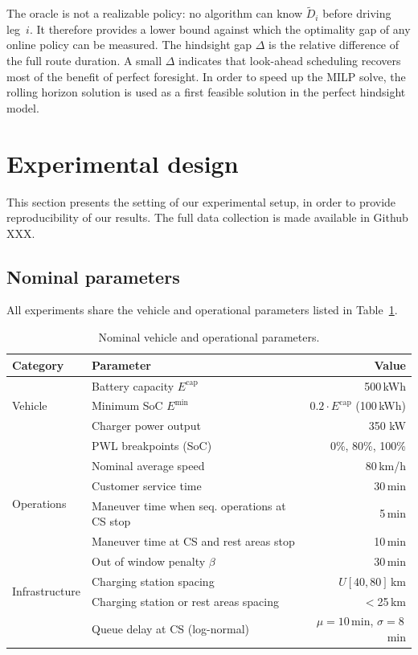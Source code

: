 \documentclass[preprint,12pt,3p]{elsarticle}
\begin{document}
The oracle is not a realizable policy: no algorithm can know $\tilde{D}_i$ before driving leg~$i$. It therefore provides a lower bound against which the optimality gap of any online policy can be measured.  The hindsight gap $\Delta$ is the relative difference of the full route duration. A small $\Delta$ indicates that look-ahead scheduling recovers most of the benefit of perfect foresight. In order to speed up the MILP solve, the rolling horizon solution is used as a first feasible solution in the perfect hindsight model.


\section{Experimental design} \label{sec:exp}
This section presents the setting of our experimental setup, in order to provide reproducibility of our results. The full data collection is made available in Github XXX.

\subsection{Nominal parameters}
All experiments share the vehicle and operational parameters listed in Table~\ref{tab:params}.

\begin{table}[ht]
\centering
\caption{Nominal vehicle and operational parameters.}
\label{tab:params}
\begin{tabular}{llr}
\toprule
\textbf{Category} & \textbf{Parameter} & \textbf{Value} \\
\midrule
\multirow{3}{*}{Vehicle}
  & Battery capacity $E^{\mathrm{cap}}$        & 500\,kWh \\
  & Minimum SoC $E^{\min}$                      & $0.2\cdot E^{\mathrm{cap}}$ (100\,kWh) \\
\midrule
\multirow{2}{*}{Charging}
  & Charger power output                      & 350 kW \\
  & PWL breakpoints (SoC)                       & 0\%, 80\%, 100\% \\
\midrule
\multirow{4}{*}{Operations}
  & Nominal average speed                       & 80\,km/h \\
  & Customer service time                       & 30\,min \\
  & Maneuver time when seq. operations at CS stop               & 5\,min \\
  & Maneuver time at CS and rest areas stop               & 10\,min \\
  & Out of window penalty $\beta$ & 30\,min \\
\midrule
\multirow{2}{*}{Infrastructure}
  & Charging station spacing                    & $U[40, 80]$\,km \\
  & Charging station or rest areas spacing      & $<$25\,km \\
  & Queue delay at CS (log-normal)              & $\mu = 10$\,min, $\sigma = 8$\,min \\
\bottomrule
\end{tabular}
\end{table}
\end{document}
